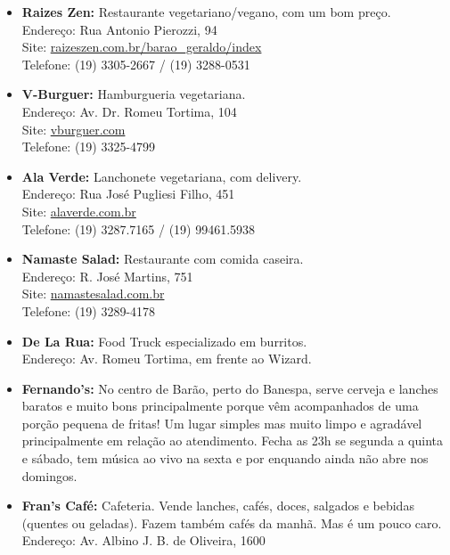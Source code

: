 \begin{itemize}
    \item  \textbf{Raizes Zen:} Restaurante vegetariano/vegano, com um bom
        preço.
        \\Endereço: Rua Antonio Pierozzi, 94
        \\Site: \url{raizeszen.com.br/barao_geraldo/index}
        \\Telefone: (19) 3305-2667 / (19) 3288-0531

    \item  \textbf{V-Burguer:} Hamburgueria vegetariana.
        \\Endereço: Av. Dr. Romeu Tortima, 104
        \\Site: \url{vburguer.com}
        \\Telefone: (19) 3325-4799

    \item  \textbf{Ala Verde:} Lanchonete vegetariana, com delivery.
        \\Endereço: Rua José Pugliesi Filho, 451
        \\Site: \url{alaverde.com.br}
        \\Telefone: (19) 3287.7165 / (19) 99461.5938

    \item  \textbf{Namaste Salad:} Restaurante com comida caseira.
        \\Endereço: R. José Martins, 751
        \\Site: \url{namastesalad.com.br}
        \\Telefone: (19) 3289-4178

    \item  \textbf{De La Rua:} Food Truck especializado em burritos.
        \\Endereço: Av. Romeu Tortima, em frente ao Wizard.

    \item  \textbf{Fernando's:} No centro de Barão, perto do Banespa, serve
        cerveja e lanches baratos e muito bons principalmente porque vêm
        acompanhados de uma porção pequena de fritas! Um lugar simples mas muito
        limpo e agradável principalmente em relação ao atendimento. Fecha as 23h
        se segunda a quinta e sábado, tem música ao vivo na sexta e por enquando
        ainda não abre nos domingos.

    \item   \textbf{Fran's Café:} Cafeteria. Vende lanches, cafés, doces,
        salgados e bebidas (quentes ou geladas). Fazem também cafés da manhã.
        Mas é um pouco caro.
        \\Endereço: Av. Albino J. B. de Oliveira, 1600


\end{itemize}
